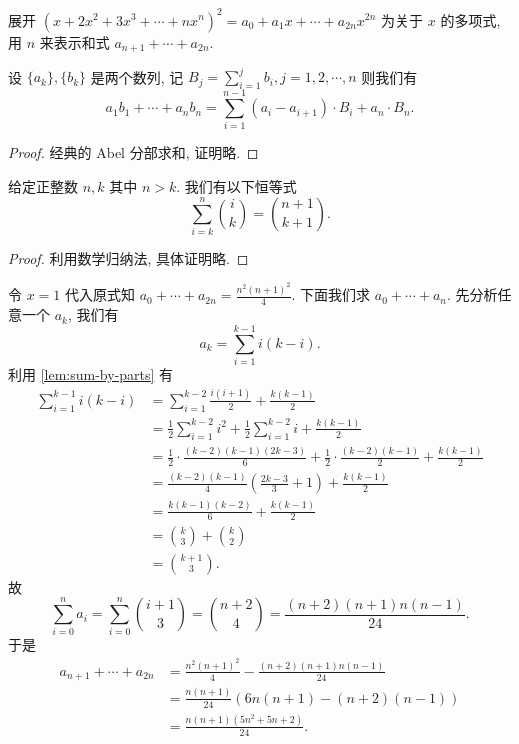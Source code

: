 \begin{prob}
\label{prob:prob-10}
展开 $(x + 2x^2 + 3x^3 + \cdots + nx^n)^2 =
a_0 + a_1x + \cdots + a_{2n}x^{2n}$ 为关于 $x$ 的多项式,
用 $n$ 来表示和式 $a_{n+1} + \cdots + a_{2n}$.
\end{prob}

\begin{lem}
\label{lem:sum-by-parts}
设 $\{a_k\}, \{b_k\}$ 是两个数列, 记 $B_j = \sum_{i=1}^j b_i,
j = 1, 2, \cdots, n$ 则我们有
\[
a_1b_1 + \cdots + a_nb_n = \sum_{i=1}^{n-1}(a_i - a_{i+1})\cdot B_i + a_n\cdot B_n.
\]
\end{lem}

\begin{proof}
经典的 Abel 分部求和, 证明略.
\end{proof}

\begin{lem}[组合恒等式]
给定正整数 $n, k$ 其中 $n > k$. 我们有以下恒等式
\[
\sum_{i=k}^n \binom{i}{k} = \binom{n+1}{k+1}.
\]
\end{lem}

\begin{proof}
利用数学归纳法, 具体证明略.
\end{proof}

\begin{soln}
令 $x = 1$ 代入原式知 $a_0 + \cdots + a_{2n} = \frac{n^2(n+1)^2}{4}$.
下面我们求 $a_0 + \cdots + a_n$.
先分析任意一个 $a_k$, 我们有
\[
a_k = \sum_{i=1}^{k-1}i(k-i).
\]
利用 \cref{lem:sum-by-parts} 有
\begin{align*}
\sum_{i=1}^{k-1}i(k-i) &= \sum_{i=1}^{k-2}\frac{i(i+1)}{2} + \frac{k(k-1)}{2}\\
                       &= \frac{1}{2}\sum_{i=1}^{k-2}i^2 + \frac{1}{2}
                          \sum_{i=1}^{k-2}i + \frac{k(k-1)}{2}\\
                       &= \frac{1}{2}\cdot \frac{(k-2)(k-1)(2k-3)}{6} +
                          \frac{1}{2}\cdot \frac{(k-2)(k-1)}{2} + \frac{k(k-1)}{2}\\
                       &= \frac{(k-2)(k-1)}{4}\left(\frac{2k-3}{3} + 1\right) + \frac{k(k-1)}{2}\\
                       &= \frac{k(k-1)(k-2)}{6} + \frac{k(k-1)}{2}\\
                       &= \binom{k}{3} + \binom{k}{2}\\
                       &= \binom{k+1}{3}.
\end{align*}
故
\[
\sum_{i=0}^n a_i = \sum_{i=0}^n \binom{i+1}{3} = \binom{n+2}{4}
= \frac{(n+2)(n+1)n(n-1)}{24}.
\]
于是
\begin{align*}
  a_{n+1} + \cdots + a_{2n} &= \frac{n^2(n+1)^2}{4} - \frac{(n+2)(n+1)n(n-1)}{24}\\
                            &= \frac{n(n+1)}{24}\left(6n(n+1) - (n+2)(n-1)\right)\\
                            &= \frac{n(n+1)(5n^2 + 5n + 2)}{24}.
\end{align*}
\end{soln}
